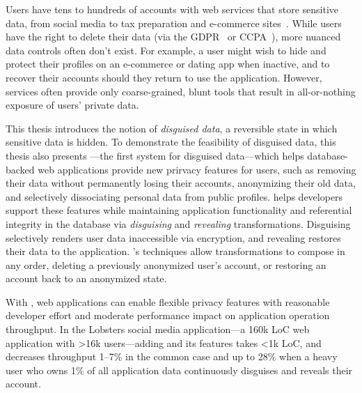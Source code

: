 Users have tens to hundreds of accounts with web services that store
sensitive data, from social media to tax preparation and e-commerce
sites~\cite{tens,hundreds,password_life_cycle}.
%
While users have the right to delete their data (via \eg the
GDPR~\cite{eu:gdpr} or CCPA~\cite{ccpa}), more nuanced
data controls often don't exist.
%
For example, a user might wish to hide and protect their profiles on an
e-commerce or dating app when inactive, and to recover their accounts should
they return to use the application. 
%
However, services often provide only coarse-grained, blunt tools that
result in all-or-nothing exposure of users’ private data.
%

%
This thesis introduces the notion of \emph{disguised data}, a reversible state
in which sensitive data is hidden.
%
To demonstrate the feasibility of disguised data, this thesis also presents
\sys---the first system for disguised data---which helps database-backed web
applications provide new prirvacy features for users, such as 
removing their data without permanently losing their accounts, anonymizing their
old data, and selectively dissociating personal data from public profiles.
%
\sys helps developers support these features while maintaining application
functionality and referential integrity in the database via \emph{disguising} and
\emph{revealing} transformations.
%
Disguising selectively renders user data inaccessible via encryption, and
revealing restores their data to the application.
%
\sys's techniques allow transformations to compose in any order, \eg deleting a
previously anonymized user's account, or restoring an account back to an
anonymized state.
%

%
With \sys, web applications can enable flexible privacy features with reasonable
developer effort and moderate performance impact on application operation
throughput.
%
In the Lobsters social media application---a 160k LoC web application with >16k
users---adding \sys and its features takes <1k LoC, and decreases throughput
1--7\% in the common case and up to 28\% when a heavy user
who owns 1\% of all application data continuously disguises and reveals their
account.
%

%
